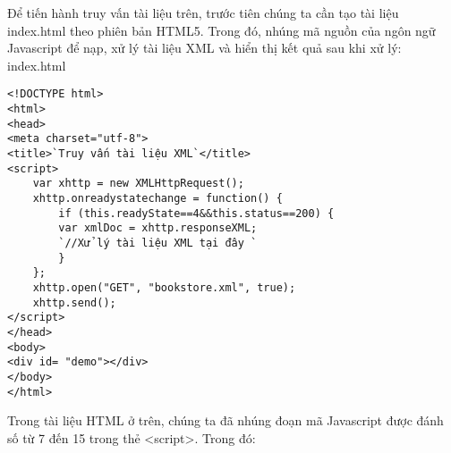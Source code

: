 Để tiến hành truy vấn tài liệu trên, trước tiên chúng ta cần tạo tài liệu index.html theo phiên bản HTML5. Trong đó, nhúng mã nguồn của ngôn ngữ Javascript để nạp, xử lý tài liệu XML và hiển thị kết quả sau khi xử lý:
index.html
\lstset{language=XML}
\begin{lstlisting}[escapechar=`]
<!DOCTYPE html> 
<html>
<head>
<meta charset="utf-8">
<title>`Truy vấn tài liệu XML`</title>
<script> 
	var xhttp = new XMLHttpRequest();
	xhttp.onreadystatechange = function() {
		if (this.readyState==4&&this.status==200) {
		var xmlDoc = xhttp.responseXML;
		`//Xử lý tài liệu XML tại đây `
		}
	};
	xhttp.open("GET", "bookstore.xml", true);
	xhttp.send();
</script>
</head>
<body>
<div id= "demo"></div>
</body>
</html>
\end{lstlisting}

Trong tài liệu HTML ở trên, chúng ta đã nhúng đoạn mã Javascript được đánh số từ 7 đến 15 trong thẻ {\ttfamily <script>}. Trong đó:
